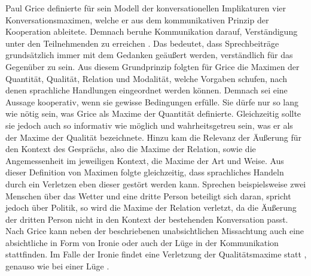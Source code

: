 Paul Grice definierte für sein Modell der konversationellen Implikaturen vier Konversationsmaximen, welche er aus dem kommunikativen Prinzip der Kooperation ableitete.
Demnach beruhe Kommunikation darauf, Verständigung unter den Teilnehmenden zu erreichen \cite[S. 220]{AL04}.
Das bedeutet, dass Sprechbeiträge grundsätzlich immer mit dem Gedanken geäußert werden, verständlich für das Gegenüber zu sein.
Aus diesem Grundprinzip folgten für Grice die Maximen der Quantität, Qualität, Relation und Modalität, welche Vorgaben schufen, nach denen sprachliche Handlungen eingeordnet werden können.
Demnach sei eine Aussage kooperativ, wenn sie gewisse Bedingungen erfülle.
Sie dürfe nur so lang wie nötig sein, was Grice als Maxime der Quantität definierte.
Gleichzeitig sollte sie jedoch auch so informativ wie möglich und wahrheitsgetreu sein, was er als der Maxime der Qualität bezeichnete.
Hinzu kam die Relevanz der Äußerung für den Kontext des Gesprächs, also die Maxime der Relation, sowie die Angemessenheit im jeweiligen Kontext, die Maxime der Art und Weise.
Aus dieser Definition von Maximen folgte gleichzeitig, dass sprachliches Handeln durch ein Verletzen eben dieser gestört werden kann.
Sprechen beispielsweise zwei Menschen über das Wetter und eine dritte Person beteiligt sich daran, spricht jedoch über Politik, so wird die Maxime der Relation verletzt, da die Äußerung der dritten Person nicht in den Kontext der bestehenden Konversation passt.
Nach Grice kann neben der beschriebenen unabsichtlichen Missachtung auch eine absichtliche in Form von Ironie oder auch der Lüge in der Kommunikation stattfinden.
Im Falle der Ironie findet eine Verletzung der Qualitätsmaxime statt \cite[S. 97]{PA99}, genauso wie bei einer Lüge \cite[S. 96]{PA99}.

